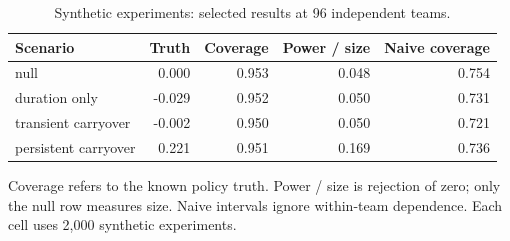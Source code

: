 \begin{table}[ht]\centering\small
\caption{Synthetic experiments: selected results at 96 independent teams.}
\begin{tabular}{lrrrr}\toprule
Scenario & Truth & Coverage & Power / size & Naive coverage\\\midrule
null & 0.000 & 0.953 & 0.048 & 0.754\\
duration only & -0.029 & 0.952 & 0.050 & 0.731\\
transient carryover & -0.002 & 0.950 & 0.050 & 0.721\\
persistent carryover & 0.221 & 0.951 & 0.169 & 0.736\\
\bottomrule\end{tabular}
\par\smallskip\parbox{.92\linewidth}{\footnotesize Coverage refers to the known policy truth. Power / size is rejection of zero; only the null row measures size. Naive intervals ignore within-team dependence. Each cell uses 2,000 synthetic experiments.}
\end{table}